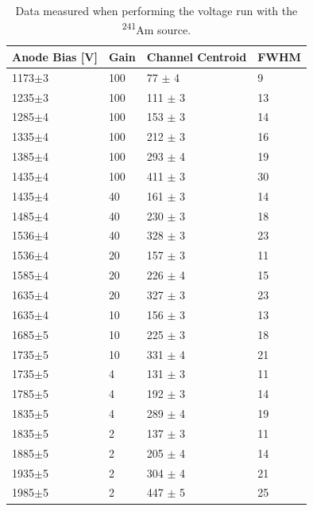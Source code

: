 \documentclass[a4paper, twoside, 11pt]{report}
\begin{document}
\begin{table}[]
\centering
\begin{tabular}{llll}
\hline \hline
Anode Bias {[}V{]} & Gain & Channel Centroid & FWHM \\ \hline
1173$\pm$3               & 100  & 77               $\pm$ 4           & 9    \\
1235$\pm$3               & 100  & 111              $\pm$ 3           & 13   \\
1285$\pm$4               & 100  & 153              $\pm$ 3           & 14   \\
1335$\pm$4               & 100  & 212              $\pm$ 3           & 16   \\
1385$\pm$4               & 100  & 293              $\pm$ 4           & 19   \\
1435$\pm$4               & 100  & 411              $\pm$ 3           & 30   \\
1435$\pm$4               & 40   & 161              $\pm$ 3           & 14   \\
1485$\pm$4               & 40   & 230              $\pm$ 3           & 18   \\
1536$\pm$4               & 40   & 328              $\pm$ 3           & 23   \\
1536$\pm$4               & 20   & 157              $\pm$ 3           & 11   \\
1585$\pm$4               & 20   & 226              $\pm$ 4           & 15   \\
1635$\pm$4               & 20   & 327              $\pm$ 3           & 23   \\
1635$\pm$4               & 10   & 156              $\pm$ 3           & 13   \\
1685$\pm$5               & 10   & 225              $\pm$ 3           & 18   \\
1735$\pm$5               & 10   & 331              $\pm$ 4           & 21   \\
1735$\pm$5               & 4    & 131              $\pm$ 3           & 11   \\
1785$\pm$5               & 4    & 192              $\pm$ 3           & 14   \\
1835$\pm$5               & 4    & 289              $\pm$ 4           & 19   \\
1835$\pm$5               & 2    & 137              $\pm$ 3           & 11   \\
1885$\pm$5               & 2    & 205              $\pm$ 4           & 14   \\
1935$\pm$5               & 2    & 304              $\pm$ 4           & 21   \\
1985$\pm$5               & 2    & 447              $\pm$ 5           & 25   \\ \hline \hline
\end{tabular}
\caption{Data measured when performing the voltage run with the \textsuperscript{241}Am source.}
\label{tbl:amRun}
\end{table}



\end{document}
